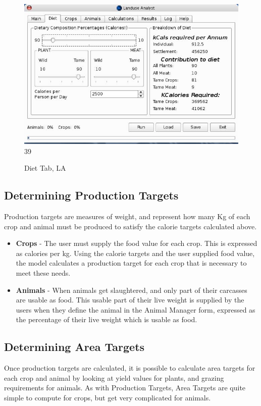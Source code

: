 \begin{figure}[htbp]
    \includegraphics[scale=.355]{./images/LanduseAnalystDiet545.jpg}
39
  \caption{\label{fig:LADiet}Diet Tab, LA}
\end{figure}

\subsection{Determining Production Targets}
  Production targets are measures of weight, and represent how many Kg of each
  crop and animal must be produced to satisfy the calorie targets calculated
  above.
\begin{itemize}
 \item \textbf{Crops} - The user must supply the food value for each crop.  This
is expressed as
calories per kg.  Using the calorie targets and the user supplied food value,
the model calculates a production target for each crop that is necessary to
meet these needs.
 \item \textbf{Animals} - When animals get slaughtered, and only part of their
carcasses are usable as
food.  This usable part of their live weight is supplied by the users when they
define the animal in the Animal Manager form, expressed as the percentage of
their live weight which is usable as food.
\end{itemize}

\subsection{Determining Area Targets}
Once production targets are calculated, it is possible to calculate area
targets for each crop and animal by looking at yield values for plants, and
grazing requirements for animals.  As with Production Targets, Area Targets are
quite simple to compute for crops, but get very complicated for animals.

